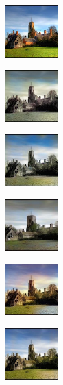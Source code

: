 \documentclass[10pt,twocolumn,letterpaper]{article}
\begin{document}
\begin{figure}[ht]
	\centering
	\captionsetup[subfigure]{labelformat=empty}
	\begin{subfigure}[b]{0.1\textwidth}
		\centering
		\includegraphics[width=2cm]{or - imgnet.jpeg}
	\end{subfigure}
	\hfill
	\begin{subfigure}[b]{0.1\textwidth}
		\includegraphics[width=2cm]{b - imgnet.jpeg}
	\end{subfigure}
	\hfill
	\begin{subfigure}[b]{0.1\textwidth}
		\includegraphics[width=2cm]{bw - imgnet.jpeg}
	\end{subfigure}
	\hfill
	\begin{subfigure}[b]{0.1\textwidth}
		\includegraphics[width=2cm]{d - imgnet.jpeg}
	\end{subfigure}
	\hfill
	\begin{subfigure}[b]{0.1\textwidth}
		\includegraphics[width=2cm]{z - imgnet2.jpeg}
	\end{subfigure}
	\hfill
	\begin{subfigure}[b]{0.1\textwidth}
		\includegraphics[width=2cm]{si - imgnet2.jpeg}

\end{subfigure}
\end{figure}
\end{document}
